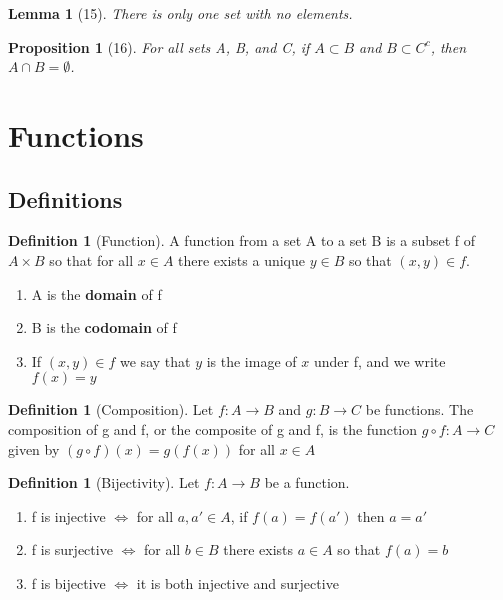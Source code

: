 \documentclass[12pt]{article}
\newtheorem{lem}[thm]{Lemma}  %
\newtheorem{prop}[thm]{Proposition}
\theoremstyle{definition}
\newtheorem{defn}[thm]{Definition}
\theoremstyle{remark}
\numberwithin{equation}{section}
\begin{document}
\begin{lem}[15]
        There is only one set with no elements.
\end{lem}



\begin{prop}[16]
        For all sets A, B, and C, if $A \subset B$ and $B \subset C^c$, then $A\cap B = \emptyset$.
\end{prop}


\clearpage


\section{Functions}


\subsection{Definitions}


\begin{defn}[Function]
        A function from a set A to a set B is a subset f of $A \times B$ so that for all $x \in A$ there exists a unique $y \in B$ so that $(x,y) \in f$.
        \begin{enumerate}
                \item A is the \textbf{domain} of f
                \item B is the \textbf{codomain} of f
                \item If $(x,y) \in f$ we say that $y$ is the image of $x$ under f, and we write $f(x)=y$
        \end{enumerate}
\end{defn}



\begin{defn}[Composition]
        Let $f:A \rightarrow B$ and $g: B \rightarrow C$ be functions. The composition of g and f, or the composite of g and f, is the function $g \circ f: A \rightarrow C$ given by $(g\circ f)(x) = g(f(x))$ for all $x \in A$
\end{defn}


\begin{defn}[Bijectivity] Let $f:A\rightarrow B$ be a function.
        \begin{enumerate}
                \item f is injective $\iff$ for all $a,a' \in A$, if $f(a) = f(a')$ then $a = a'$
                \item f is surjective $\iff$ for all $b \in B$ there exists $a \in A$ so that $f(a) = b$
                \item f is bijective $\iff$ it is both injective and surjective
        \end{enumerate}
\end{defn}
\end{document}
